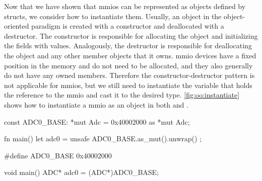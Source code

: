 Now that we have shown that \glspl{mmio} can be represented as objects defined by structs, we consider how to instantiate them.
Usually, an object in the object-oriented paradigm is created with a constructor and deallocated with a destructor.
The constructor is responsible for allocating the object and initializing the fields with values.
Analogously, the destructor is responsible for deallocating the object and any other member objects that it owns.
\gls{mmio} devices have a fixed position in the memory and do not need to be allocated, and they also generally do not have any owned members.
Therefore the constructor-destructor pattern is not applicable for \gls{mmio}s, but we still need to instantiate the variable that holds the reference to the \gls{mmio} and cast it to the desired type.
\autoref{fig:oo:instantiate} shows how to instantiate a \gls{mmio} as an object in both {\C} and {\rust}.

\begin{listing}[H]
  \begin{minipage}{0.46\textwidth}
  \begin{listing}
    \begin{rustcode}
const ADC0_BASE: *mut Adc
      = 0x40002000 as *mut Adc;

fn main() {
  let adc0 = unsafe {
    ADC0_BASE.as_mut().unwrap()
  };
}
    \end{rustcode}
    \caption{Rust}
  \end{listing}
  \end{minipage}
  \hfill
  \begin{minipage}{0.45\textwidth}
  \begin{listing}
    \begin{ccode}
#define ADC0_BASE 0x40002000

void main() {
  ADC* adc0 = (ADC*)ADC0_BASE;
}
    \end{ccode}
    \caption{{\C}}
  \end{listing}
  \end{minipage}
  \caption{Instantiating a \glspl{mmio}}
  \label{fig:oo:instantiate}
\end{listing}

